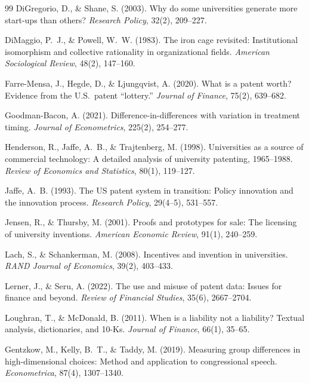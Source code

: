 \documentclass[12pt]{article}
\begin{document}
\begin{thebibliography}{99}
DiGregorio, D., \& Shane, S. (2003). Why do some universities generate more start-ups
than others? \textit{Research Policy}, 32(2), 209--227.

DiMaggio, P.~J., \& Powell, W.~W. (1983). The iron cage revisited: Institutional
isomorphism and collective rationality in organizational fields. \textit{American
Sociological Review}, 48(2), 147--160.

Farre-Mensa, J., Hegde, D., \& Ljungqvist, A. (2020). What is a patent worth? Evidence
from the U.S.\ patent ``lottery.'' \textit{Journal of Finance}, 75(2), 639--682.

Goodman-Bacon, A. (2021). Difference-in-differences with variation in treatment timing.
\textit{Journal of Econometrics}, 225(2), 254--277.

Henderson, R., Jaffe, A.~B., \& Trajtenberg, M. (1998). Universities as a source of
commercial technology: A detailed analysis of university patenting, 1965--1988.
\textit{Review of Economics and Statistics}, 80(1), 119--127.

Jaffe, A.~B. (1993). The US patent system in transition: Policy innovation and the
innovation process. \textit{Research Policy}, 29(4--5), 531--557.

Jensen, R., \& Thursby, M. (2001). Proofs and prototypes for sale: The licensing of
university inventions. \textit{American Economic Review}, 91(1), 240--259.

Lach, S., \& Schankerman, M. (2008). Incentives and invention in universities.
\textit{RAND Journal of Economics}, 39(2), 403--433.

Lerner, J., \& Seru, A. (2022). The use and misuse of patent data: Issues for finance
and beyond. \textit{Review of Financial Studies}, 35(6), 2667--2704.

Loughran, T., \& McDonald, B. (2011). When is a liability not a liability? Textual
analysis, dictionaries, and 10-Ks. \textit{Journal of Finance}, 66(1), 35--65.

Gentzkow, M., Kelly, B.~T., \& Taddy, M. (2019). Measuring group differences in
high-dimensional choices: Method and application to congressional speech.
\textit{Econometrica}, 87(4), 1307--1340.


\end{thebibliography}
\end{document}
